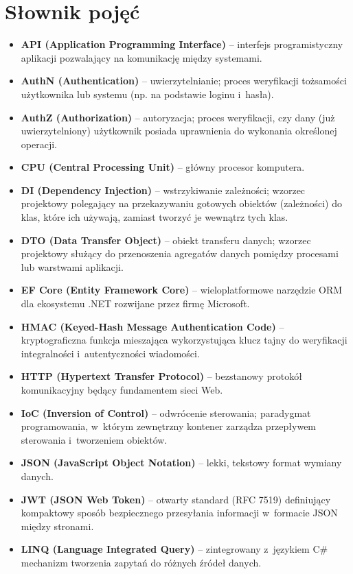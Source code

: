 \documentclass{SGGW-thesis}
\begin{document}
\section*{Słownik pojęć}
\begin{itemize}
    \item \textbf{API (Application Programming Interface)} – interfejs programistyczny aplikacji pozwalający na komunikację między systemami.
    \item \textbf{AuthN (Authentication)} – uwierzytelnianie; proces weryfikacji tożsamości użytkownika lub systemu (np. na podstawie loginu i~hasła).
    \item \textbf{AuthZ (Authorization)} – autoryzacja; proces weryfikacji, czy dany (już uwierzytelniony) użytkownik posiada uprawnienia do wykonania określonej operacji.
    \item \textbf{CPU (Central Processing Unit)} – główny procesor komputera.
    \item \textbf{DI (Dependency Injection)} – wstrzykiwanie zależności; wzorzec projektowy polegający na przekazywaniu gotowych obiektów (zależności) do klas, które ich używają, zamiast tworzyć je wewnątrz tych klas.
    \item \textbf{DTO (Data Transfer Object)} – obiekt transferu danych; wzorzec projektowy służący do przenoszenia agregatów danych pomiędzy procesami lub warstwami aplikacji.
    \item \textbf{EF Core (Entity Framework Core)} – wieloplatformowe narzędzie ORM dla ekosystemu .NET rozwijane przez firmę Microsoft.
    \item \textbf{HMAC (Keyed-Hash Message Authentication Code)} – kryptograficzna funkcja mieszająca wykorzystująca klucz tajny do weryfikacji integralności i~autentyczności wiadomości.
    \item \textbf{HTTP (Hypertext Transfer Protocol)} – bezstanowy protokół komunikacyjny będący fundamentem sieci Web.
    \item \textbf{IoC (Inversion of Control)} – odwrócenie sterowania; paradygmat programowania, w~którym zewnętrzny kontener zarządza przepływem sterowania i~tworzeniem obiektów.
    \item \textbf{JSON (JavaScript Object Notation)} – lekki, tekstowy format wymiany danych.
    \item \textbf{JWT (JSON Web Token)} – otwarty standard (RFC 7519) definiujący kompaktowy sposób bezpiecznego przesyłania informacji w~formacie JSON między stronami.
    \item \textbf{LINQ (Language Integrated Query)} – zintegrowany z~językiem C\# mechanizm tworzenia zapytań do różnych źródeł danych.

\end{itemize}
\end{document}

